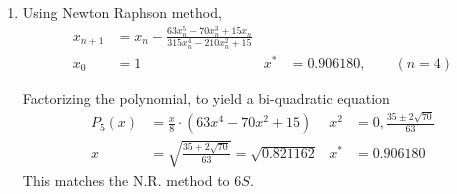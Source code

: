 \begin{enumerate}
    \item Using Newton Raphson method,
          \begin{align}
              x_{n+1} & = x_n - \frac{63x_n^5  - 70x_n^3 + 15x_n}
              {315x_n^4 - 210x_n^2 + 15}                            \\
              x_0     & = 1                                       &
              x^*     & = 0.906180,\qquad (n=4)
          \end{align}
          \begin{figure}[H]
              \centering
          \end{figure}
          Factorizing the polynomial, to yield a bi-quadratic equation
          \begin{align}
              P_5(x) & = \frac{x}{8} \cdot (63x^4 - 70x^2 + 15)              &
              x^2    & = 0, \frac{35 \pm 2\sqrt{70}}{63}                       \\
              x      & = \sqrt{\frac{35 + 2\sqrt{70}}{63}} = \sqrt{0.821162} &
              x^*    & = 0.906180
          \end{align}
          This matches the N.R. method to $ 6S $.


\end{enumerate}

